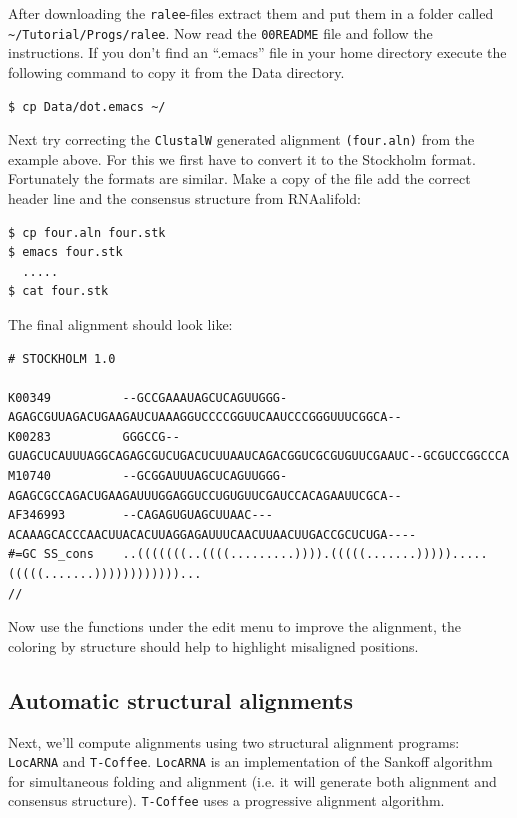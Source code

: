 \documentclass[a4paper]{article}
\begin{document}
After downloading the \texttt{ralee}-files extract them and put them
in a folder called \texttt{\textasciitilde/Tutorial/Progs/ralee}. Now
read the \texttt{00README} file and follow the instructions. If you
don't find an ``.emacs'' file in your home directory execute the
following command to copy it from the Data directory.\\

\begin{verbatim}
$ cp Data/dot.emacs ~/
\end{verbatim}

Next try correcting the \texttt{ClustalW} generated alignment \texttt{(four.aln)} from the
example above. For this we first have to convert it to the Stockholm format.
Fortunately the formats are similar. Make a copy of the file add the
correct header line and the consensus structure from RNAalifold:
\begin{verbatim}
$ cp four.aln four.stk
$ emacs four.stk
  .....
$ cat four.stk
\end{verbatim}
The final alignment should look like:
\begin{tiny}
\begin{verbatim}
# STOCKHOLM 1.0

K00349          --GCCGAAAUAGCUCAGUUGGG-AGAGCGUUAGACUGAAGAUCUAAAGGUCCCCGGUUCAAUCCCGGGUUUCGGCA--
K00283          GGGCCG--GUAGCUCAUUUAGGCAGAGCGUCUGACUCUUAAUCAGACGGUCGCGUGUUCGAAUC--GCGUCCGGCCCA
M10740          --GCGGAUUUAGCUCAGUUGGG-AGAGCGCCAGACUGAAGAUUUGGAGGUCCUGUGUUCGAUCCACAGAAUUCGCA--
AF346993        --CAGAGUGUAGCUUAAC---ACAAAGCACCCAACUUACACUUAGGAGAUUUCAACUUAACUUGACCGCUCUGA----
#=GC SS_cons    ..(((((((..((((.........)))).(((((.......))))).....(((((.......))))))))))))...
//
\end{verbatim}%
\end{tiny}
Now use the functions under the edit menu to improve the alignment, the
coloring by structure should help to highlight misaligned positions.

\subsection{Automatic structural alignments}

Next, we'll compute alignments using two structural alignment programs:
\texttt{LocARNA} and \texttt{T-Coffee}. \texttt{LocARNA} is an implementation
of the Sankoff algorithm for simultaneous folding and alignment (i.e. it
will generate both alignment and consensus structure). \texttt{T-Coffee} uses a
progressive alignment algorithm.
\end{document}
